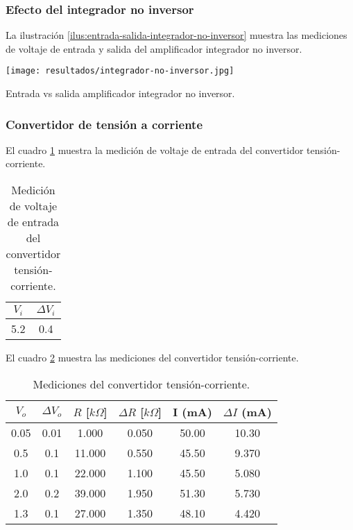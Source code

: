 \subsubsection{Efecto del integrador no inversor}

La ilustración \ref{ilus:entrada-salida-integrador-no-inversor} muestra las mediciones de voltaje de entrada y salida del amplificador integrador no inversor.
\begin{ilustracion}[ht]
    \centering
    \texttt{[image: resultados/integrador-no-inversor.jpg]}
    \caption{Entrada vs salida amplificador integrador no inversor.}
    \label{ilus:entrada-salida-integrador-no-inversor}
\end{ilustracion}

\subsubsection{Convertidor de tensión a corriente}

El cuadro \ref{tab:medicion-voltaje-entrada-convertidor-tension-corriente} muestra la medición de voltaje de entrada del convertidor tensión-corriente.

\begin{table}[ht]
    \centering
    \begin{tabular}{|c|c|}
        \hline
        \(V_i\) & \(\Delta V_i\) \\ \hline
        5.2 & 0.4 \\ \hline
    \end{tabular}
    \caption{Medición de voltaje de entrada del convertidor tensión-corriente.}
    \label{tab:medicion-voltaje-entrada-convertidor-tension-corriente}
\end{table}

El cuadro \ref{tab:resultados-convertidor-tension-corriente} muestra las mediciones del convertidor tensión-corriente.

\begin{table}[h!]
\centering
\begin{tabular}{|c|c|c|c|c|c|}
\hline
\(V_o\) & \(\Delta V_o\) & \(R\) [$k\Omega$] & \(\Delta R\) [$k\Omega$] & I (mA) & \(\Delta I\) (mA) \\ \hline
0.05 & 0.01 & 1.000 & 0.050 & 50.00 & 10.30 \\ \hline
0.5 & 0.1 & 11.000 & 0.550 & 45.50 & 9.370 \\ \hline
1.0 & 0.1 & 22.000 & 1.100 & 45.50 & 5.080 \\ \hline
2.0 & 0.2 & 39.000 & 1.950 & 51.30 & 5.730 \\ \hline
1.3 & 0.1 & 27.000 & 1.350 & 48.10 & 4.420 \\ \hline
\end{tabular}
\caption{Mediciones del convertidor tensión-corriente.}
\label{tab:resultados-convertidor-tension-corriente}
\end{table}

